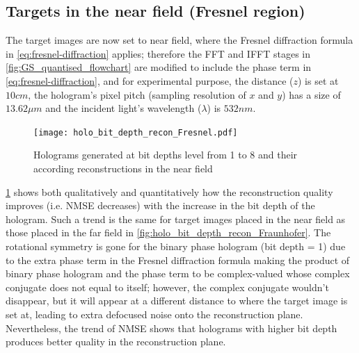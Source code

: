 \subsection{Targets in the near field (Fresnel region)}
	The target images are now set to near field, where the Fresnel diffraction formula in \cref{eq:fresnel-diffraction} applies; therefore the FFT and IFFT stages in \cref{fig:GS_quantised_flowchart} are modified to include the phase term in \cref{eq:fresnel-diffraction}, and for experimental purpose, the distance ($z$) is set at $10cm$, the hologram's pixel pitch (sampling resolution of $x$ and $y$) has a size of $13.62\mu m$ and the incident light's wavelength ($\lambda$) is $532nm$.
	\begin{figure} [H]
	   \begin{center}
	   \texttt{[image: holo\_bit\_depth\_recon\_Fresnel.pdf]}
	   \end{center}
	   \caption{\label{fig:holo_bit_depth_recon_Fresnel} Holograms generated at bit depths level from 1 to 8 and their according reconstructions in the near field}
	\end{figure}

	\cref{fig:holo_bit_depth_recon_Fresnel} shows both qualitatively and quantitatively how the reconstruction quality improves (i.e. NMSE decreases) with the increase in the bit depth of the hologram. Such a trend is the same for target images placed in the near field as those placed in the far field in \cref{fig:holo_bit_depth_recon_Fraunhofer}. The rotational symmetry is gone for the binary phase hologram (bit depth = 1) due to the extra phase term in the Fresnel diffraction formula making the product of binary phase hologram and the phase term to be complex-valued whose complex conjugate does not equal to itself; however, the complex conjugate wouldn't disappear, but it will appear at a different distance to where the target image is set at, leading to extra defocused noise onto the reconstruction plane. Nevertheless, the trend of NMSE shows that holograms with higher bit depth produces better quality in the reconstruction plane.

